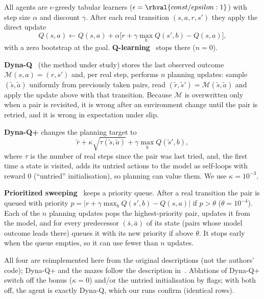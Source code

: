 All agents are $\epsilon$-greedy tabular learners ($\epsilon=\rhval{const/epsilon:1}$) with step size $\alpha$ and discount $\gamma$. After each real transition $(s,a,r,s')$ they apply the direct update
\begin{equation}
Q(s,a)\leftarrow Q(s,a)+\alpha\big[r+\gamma\max_{b}Q(s',b)-Q(s,a)\big],
\end{equation}
with a zero bootstrap at the goal. \textbf{Q-learning}~\cite{watkins1992q} stops there ($n=0$).

\textbf{Dyna-Q}~\cite{sutton1991dyna} (the method under study) stores the last observed outcome $\mathcal M(s,a)=(r,s')$ and, per real step, performs $n$ planning updates: sample $(\tilde s,\tilde a)$ uniformly from previously taken pairs, read $(\tilde r,\tilde s')=\mathcal M(\tilde s,\tilde a)$ and apply the update above with that transition. Because $\mathcal M$ is overwritten only when a pair is revisited, it is wrong after an environment change until the pair is retried, and it is wrong in expectation under slip.

\textbf{Dyna-Q+} changes the planning target to
\begin{equation}
\tilde r+\kappa\sqrt{\tau(\tilde s,\tilde a)}+\gamma\max_b Q(\tilde s',b),
\end{equation}
where $\tau$ is the number of real steps since the pair was last tried, and, the first time a state is visited, adds its untried actions to the model as self-loops with reward 0 (``untried'' initialisation), so planning can value them. We use $\kappa=10^{-3}$.

\textbf{Prioritized sweeping}~\cite{moore1993prioritized} keeps a priority queue. After a real transition the pair is queued with priority $p=|r+\gamma\max_bQ(s',b)-Q(s,a)|$ if $p>\theta$ ($\theta=10^{-4}$). Each of the $n$ planning updates pops the highest-priority pair, updates it from the model, and for every predecessor $(\bar s,\bar a)$ of its state (pairs whose model outcome leads there) queues it with its new priority if above $\theta$. It stops early when the queue empties, so it can use fewer than $n$ updates.

All four are reimplemented here from the original descriptions (not the authors' code); Dyna-Q+ and the mazes follow the description in~\cite{sutton1990integrated}. Ablations of Dyna-Q+ switch off the bonus ($\kappa=0$) and/or the untried initialisation by flags; with both off, the agent is exactly Dyna-Q, which our runs confirm (identical rows).

